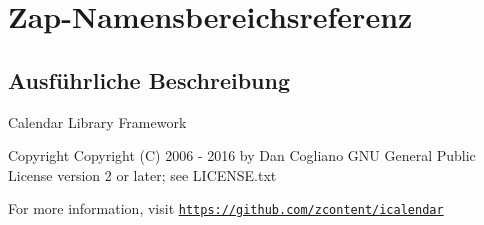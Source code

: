 \hypertarget{namespace_zap}{}\section{Zap-\/\+Namensbereichsreferenz}
\label{namespace_zap}


\subsection{Ausführliche Beschreibung}
Calendar Library Framework

\begin{DoxyCopyright}{Copyright}
Copyright (C) 2006 -\/ 2016 by Dan Cogliano  G\+NU General Public License version 2 or later; see L\+I\+C\+E\+N\+S\+E.\+txt
\end{DoxyCopyright}
For more information, visit \href{https://github.com/zcontent/icalendar}{\tt https\+://github.\+com/zcontent/icalendar} 
